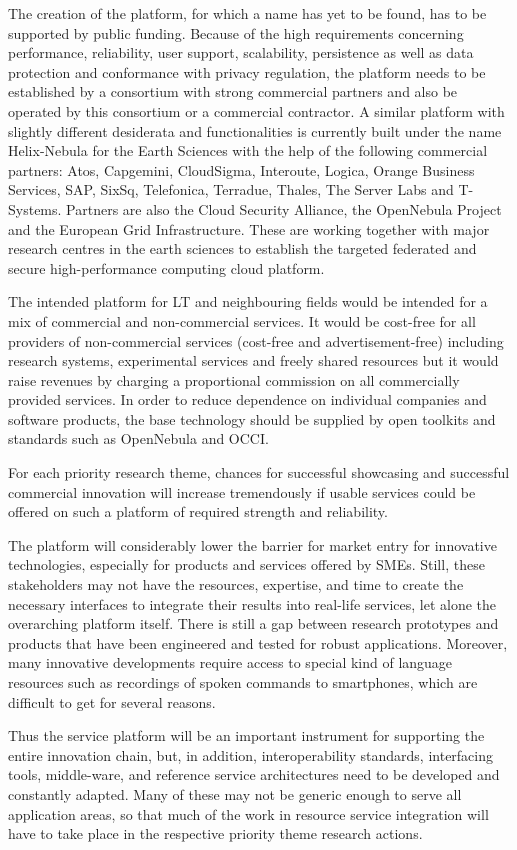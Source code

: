 \documentclass[10pt, plain]{../../metanetpaper}
\begin{document}
\begin{multicols}{2}
The creation of the platform, for which a name has yet to be found, has to be supported by public funding. Because of the high requirements concerning performance, reliability, user support, scalability, persistence as well as data protection and conformance with privacy regulation, the platform needs to be established by a consortium with strong commercial partners and also be operated by this consortium or a commercial contractor. A similar platform with slightly different desiderata and functionalities is currently built under the name Helix-Nebula for the Earth Sciences with the help of the following commercial partners: Atos, Capgemini, CloudSigma, Interoute, Logica, Orange Business Services, SAP, SixSq, Telefonica, Terradue, Thales, The Server Labs and T-Systems. Partners are also the Cloud Security Alliance, the OpenNebula Project and the European Grid Infrastructure. These are working together with major research centres in the earth sciences to establish the targeted federated and secure high-performance computing cloud platform.
 
The intended platform for LT and neighbouring fields would be intended for a mix of commercial and non-commercial services. It would be cost-free for all providers of non-commercial services (cost-free and advertisement-free) including research systems, experimental services and freely shared resources but it would raise revenues by charging a proportional commission on all commercially provided services. In order to reduce dependence on individual companies and software products, the base technology should be supplied by open toolkits and standards such as OpenNebula and OCCI.  
 
For each priority research theme, chances for successful showcasing and successful commercial innovation will increase tremendously if usable services could be offered on such a platform of required strength and reliability.
 
The platform will considerably lower the barrier for market entry for innovative technologies, especially for products and services offered by SMEs. Still, these stakeholders may not have the resources, expertise, and time to create the necessary interfaces to integrate their results into real-life services, let alone the overarching platform itself. There is still a gap between research prototypes and products that have been engineered and tested for robust applications. Moreover, many innovative developments require access to special kind of language resources such as recordings of spoken commands to smartphones, which are difficult to get for several reasons.
 
Thus the service platform will be an important instrument for supporting the entire innovation chain, but, in addition, interoperability standards, interfacing tools, middle-ware, and reference service architectures need to be developed and constantly adapted. Many of these may not be generic enough to serve all application areas, so that much of the work in resource service integration will have to take place in the respective priority theme research actions.
\end{multicols}
\end{document}
